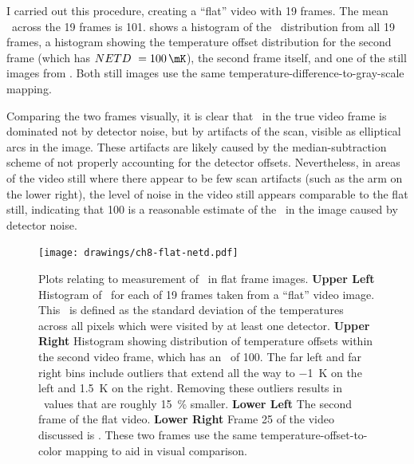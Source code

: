 I carried out this procedure, creating a ``flat'' video with 19 frames.
The mean \NETD\ across the 19 frames is \SI{101}{\mK}.
 shows a histogram of the \NETD\ distribution from all 19 frames, a histogram showing the temperature offset distribution for the second frame (which has $\NETD\ = \SI{100}{\mK}$), the second frame itself, and one of the still images from .
Both still images use the same temperature-difference-to-gray-scale mapping.

Comparing the two frames visually, it is clear that \NETD\ in the true video frame is dominated not by detector noise, but by artifacts of the scan, visible as elliptical arcs in the image.
These artifacts are likely caused by the median-subtraction scheme of  not properly accounting for the detector offsets.
Nevertheless, in areas of the video still where there appear to be few scan artifacts (such as the arm on the lower right), the level of noise in the video still appears comparable to the flat still, indicating that \SI{100}{\mK} is a reasonable estimate of the \NETD\ in the image caused by detector noise.

\begin{figure}
\centering
\texttt{[image: drawings/ch8-flat-netd.pdf]}
\caption[Plots relating to measurement of \NETD\ in flat frame images]{
  Plots relating to measurement of \NETD\ in flat frame images.
  \textbf{Upper Left} Histogram of \NETD\ for each of 19 frames taken from a ``flat'' video image. This \NETD\ is defined as the standard deviation of the temperatures across all pixels which were visited by at least one detector. 
  \textbf{Upper Right} Histogram showing distribution of temperature offsets within the second video frame, which has an \NETD\ of \SI{100}{\mK}.
                       The far left and far right bins include outliers that extend all the way to \SI{-1}{\K} on the left and \SI{1.5}{\K} on the right.
                       Removing these outliers results in \NETD\ values that are roughly \SI{15}{\percent} smaller.
  \textbf{Lower Left} The second frame of the flat video.
  \textbf{Lower Right} Frame 25 of the video discussed is .
These two frames use the same temperature-offset-to-color mapping to aid in visual comparison.
}
\label{fig:ch8-flat-netd}
\end{figure}

